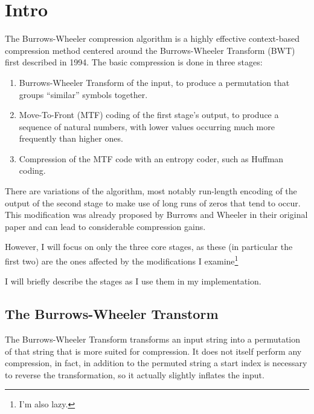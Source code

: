 \documentclass[a4paper]{scrreprt}
\begin{document}
\begin{abstract}

\end{abstract}

\chapter{Intro}


The Burrows-Wheeler compression algorithm is a highly effective context-based
compression method centered around the Burrows-Wheeler Transform (BWT) first
described in 1994\cite{burrowswheeler1994bwt}.
The basic compression is done in three stages:
\begin{enumerate}
  \item Burrows-Wheeler Transform of the input, to produce a permutation that
  groups ``similar'' symbols together.
  \item Move-To-Front (MTF) coding of the first stage's output, to produce a
  sequence of natural numbers, with lower values occurring much more frequently
  than higher ones.
  \item Compression of the MTF code with an entropy coder, such as Huffman
  coding.
\end{enumerate}
There are variations of the algorithm, most notably run-length encoding of the
output of the second stage to make use of long runs of zeros that tend to occur.
This modification was already proposed by Burrows and Wheeler in their original
paper and can lead to considerable compression gains.

However, I will focus on only the three core stages, as these (in particular
the first two) are the ones affected by the modifications I
examine\footnote{I'm also lazy.}

I will briefly describe the stages as I use them in my implementation.

\section{The Burrows-Wheeler Transtorm}

The Burrows-Wheeler Transform transforms an input string into a permutation of
that string that is more suited for compression. It does not itself perform any
compression, in fact, in addition to the permuted string a start index is
necessary to reverse the transformation, so it actually slightly inflates the
input.
\end{document}
